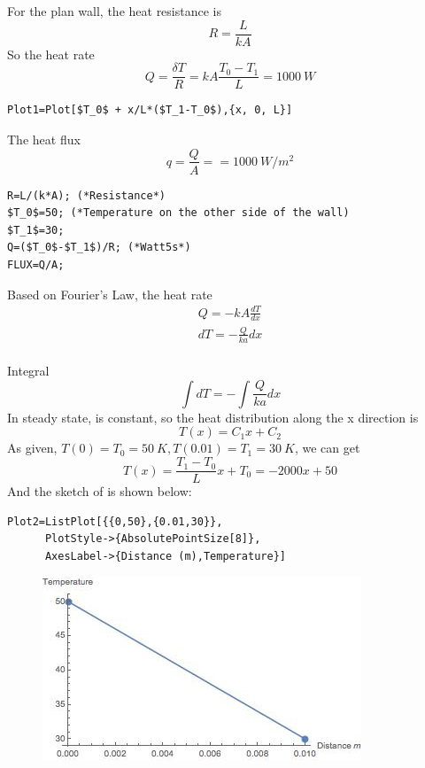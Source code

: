 \begin{solution}
For the plan wall, the heat resistance is
$$R=\frac{L}{kA}$$
So the heat rate 
$$
Q=\frac{\delta T}{R}=kA\frac{T_0-T_1}{L}=1000~W
$$

\begin{lstlisting}
Plot1=Plot[$T_0$ + x/L*($T_1-T_0$),{x, 0, L}]
\end{lstlisting}
The heat flux$$q=\frac{Q}{A}==1000~W/m^2$$
\begin{lstlisting}
R=L/(k*A); (*Resistance*)
$T_0$=50; (*Temperature on the other side of the wall)
$T_1$=30;
Q=($T_0$-$T_1$)/R; (*Watt5s*)
FLUX=Q/A;
\end{lstlisting}
Based on Fourier’s Law, the heat rate
\begin{eqnarray*}
Q=-kA\frac{dT}{dx}\\
dT=-\frac{Q}{ka}dx
\end{eqnarray*}
~\\
Integral
$$\int dT=-\int \frac{Q}{ka} dx$$
In steady state,  is constant, so the heat distribution along the x direction is
$$T(x)=C_1x+C_2$$
As given, $T(0)=T_0=50~K, T(0.01)=T_1=30~K$, we can get
$$T(x)=\frac{T_1-T_0}{L}x+T_0=-2000x+50$$
And the sketch of  is shown below:
\begin{lstlisting}
Plot2=ListPlot[{{0,50},{0.01,30}},
      PlotStyle->{AbsolutePointSize[8]},
      AxesLabel->{Distance (m),Temperature}]
\end{lstlisting}

\begin{figure}[h!]
  \centering
    \includegraphics[scale=0.6]{figures/ch2/2}
\end{figure}
\end{solution}

